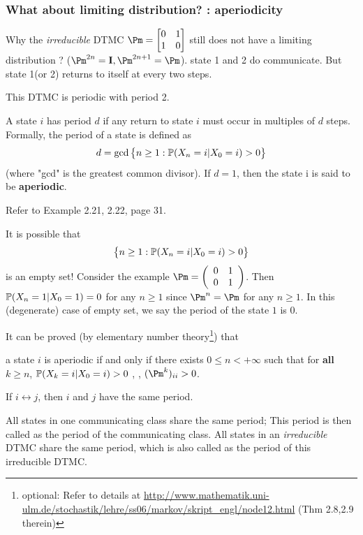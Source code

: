 \documentclass[english,10pt]{beamer}
\begin{document}
\begin{frame}
\frametitle{ What about   limiting distribution? : aperiodicity}
\biz[<+->]
\item Why the   {\it irreducible } DTMC  $\Pm=\left[\begin{matrix} 0 & 1 \\
1& 0 \end{matrix}\right]$  still does not have a limiting distribution ?
($\Pm^{2n}=\eye, \Pm^{2n+1}=\Pm$).
 state 1 and 2 do  communicate. But state 1(or 2) returns to itself at every two steps.
\item This DTMC is periodic with period 2.
\eiz
\pause 
\begin{definition}
A state $i$ has period $d$ if any return to state $i$ must occur in multiples of $d$   steps. Formally, the period of a state is defined as
\[ d = \operatorname{gcd}\big\{ n \geq 1: \mathbb{P}(X_n = i | X_0 = i) > 0\big\} \]
(where "gcd" is the greatest common divisor).
If $d=1$, then the state i is said to be {\bf aperiodic}.
\end{definition}
\bigskip 

 
Refer to Example 2.21, 2.22, page 31.
\end{frame}

\begin{frame}
It is possible that $$\big\{ n \geq 1: \mathbb{P}(X_n = i | X_0 = i) > 0\big\} $$ is an empty set! 
{\small
Consider the example $
\Pm=\left(\begin{array}{cc}
0 &1\\
0 &1\\
\end{array}\right)
$. Then $  \mathbb{P}(X_n = 1 | X_0 = 1) = 0 $ for any $n \geq 1$
since $\Pm^n= \Pm$ for any $n\geq 1$.
In this (degenerate) case of empty set, 
we say the period of the state $1$ is $0$.
 }
\pause 


It can be  proved (by elementary number theory\footnote{optional: Refer to details at 
\url{http://www.mathematik.uni-ulm.de/stochastik/lehre/ss06/markov/skript_engl/node12.html}
(Thm 2.8,2.9 therein)}) that 
\ben
\item a state $i$ is aperiodic if and only if there exists $ 0\leq n <+\infty$ such that for  {\bf all} $k \geq n$,
$ \mathbb{P}(X_{k} = i | X_0 = i) > 0$ , \ie, $(\Pm^{k})_{ii}>0$.
\item
If $i \leftrightarrow j$, then $i$ and $j$ have the same period.
\een

\pause
\begin{definition}
All states in one communicating class share the same period;
This period is then called as the period of the communicating class.
All states in an {\it irreducible} DTMC share the same period, which 
is also called as the period of this irreducible DTMC.
\end{definition}


\end{frame}
\end{document}
